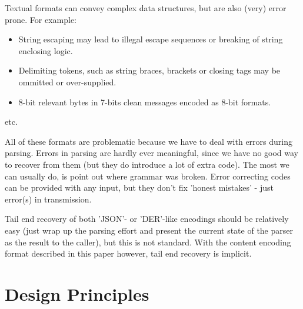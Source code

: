 Textual formats can convey complex data structures, but are also
(very) error prone. For example:

\begin{itemize}
\item String escaping may lead to illegal escape sequences or breaking
  of string enclosing logic.
\item Delimiting tokens, such as string braces, brackets or closing tags
      may be ommitted or over-supplied.
\item 8-bit relevant bytes in 7-bits clean messages encoded as 8-bit formats.
\end{itemize}
etc.

All of these formats are problematic because we have to deal with
errors during parsing. Errors in parsing are hardly ever meaningful,
since we have no good way to recover from them (but they do introduce
a lot of extra code). The most we can usually do, is point out where
grammar was broken. Error correcting codes can be provided with any input,
but they don't fix 'honest mistakes' - just error(s) in transmission.

Tail end recovery of both 'JSON'- or 'DER'-like encodings should be
relatively easy (just wrap up the parsing effort and present the current
state of the parser as the result to the caller), but this is not standard.
With the content encoding format described in this paper however, tail end
recovery is implicit.

\section{Design Principles}
 
